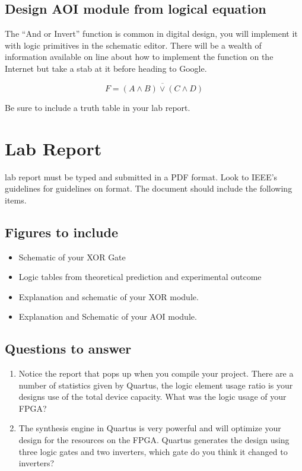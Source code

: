       \subsection{Design AOI module from logical equation} 
      The ``And or Invert'' function is common in digital design, you will implement it with logic primitives in the schematic editor. There will be a wealth of information available on line about how to implement the function on the Internet but take a stab at it before heading to Google. 

      \begin{displaymath}
        F = \overline{(A \wedge B) \vee (C \wedge D)}
      \end{displaymath}

      Be sure to include a truth table in your lab report.

  \section{Lab Report}
     lab report must be typed and submitted in a PDF format. Look to IEEE's guidelines for  guidelines on format. The document should include the following items.
    
    \subsection{Figures to include}
    \begin{itemize}
      \item Schematic of your XOR Gate
      \item Logic tables from theoretical prediction and experimental outcome
      \item Explanation and schematic of your XOR module.
      \item Explanation and Schematic of your AOI module.
    \end{itemize}

    \subsection{Questions to answer}
    \begin{enumerate}
      \item Notice the report that pops up when you compile your project. There are a number of statistics given by Quartus, the logic element usage ratio is your designs use of the total device capacity. What was the logic usage of your FPGA?
      \item The synthesis engine in Quartus is very powerful and will optimize your design for the resources on the   FPGA. Quartus generates the design using three logic gates and two inverters, which gate do you think it changed to inverters?
    \end{enumerate}

